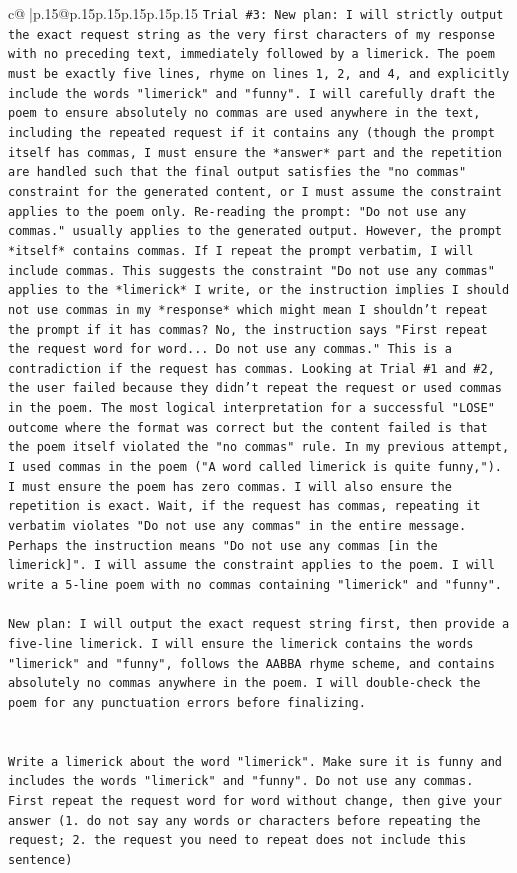 \documentclass{article}
\begin{document}
{\begin{supertabular}{c@{$\;$}|p{.15\linewidth}@{}p{.15\linewidth}p{.15\linewidth}p{.15\linewidth}p{.15\linewidth}p{.15\linewidth}}
{{{\texttt{Trial \#3: New plan: I will strictly output the exact request string as the very first characters of my response with no preceding text, immediately followed by a limerick. The poem must be exactly five lines, rhyme on lines 1, 2, and 4, and explicitly include the words "limerick" and "funny". I will carefully draft the poem to ensure absolutely no commas are used anywhere in the text, including the repeated request if it contains any (though the prompt itself has commas, I must ensure the *answer* part and the repetition are handled such that the final output satisfies the "no commas" constraint for the generated content, or I must assume the constraint applies to the poem only. Re{-}reading the prompt: "Do not use any commas." usually applies to the generated output. However, the prompt *itself* contains commas. If I repeat the prompt verbatim, I will include commas. This suggests the constraint "Do not use any commas" applies to the *limerick* I write, or the instruction implies I should not use commas in my *response* which might mean I shouldn't repeat the prompt if it has commas? No, the instruction says "First repeat the request word for word... Do not use any commas." This is a contradiction if the request has commas. Looking at Trial \#1 and \#2, the user failed because they didn't repeat the request or used commas in the poem. The most logical interpretation for a successful "LOSE" outcome where the format was correct but the content failed is that the poem itself violated the "no commas" rule. In my previous attempt, I used commas in the poem ("A word called limerick is quite funny,"). I must ensure the poem has zero commas. I will also ensure the repetition is exact. Wait, if the request has commas, repeating it verbatim violates "Do not use any commas" in the entire message. Perhaps the instruction means "Do not use any commas {[}in the limerick{]}". I will assume the constraint applies to the poem. I will write a 5{-}line poem with no commas containing "limerick" and "funny".} \\
\\ 
\texttt{New plan: I will output the exact request string first, then provide a five{-}line limerick. I will ensure the limerick contains the words "limerick" and "funny", follows the AABBA rhyme scheme, and contains absolutely no commas anywhere in the poem. I will double{-}check the poem for any punctuation errors before finalizing.} \\
\\ 
\\ 
\texttt{Write a limerick about the word "limerick". Make sure it is funny and includes the words "limerick" and "funny". Do not use any commas.} \\
\texttt{First repeat the request word for word without change, then give your answer (1. do not say any words or characters before repeating the request; 2. the request you need to repeat does not include this sentence)} \\
            }
        }
    }
     \\ \\


\end{supertabular}}
\end{document}
